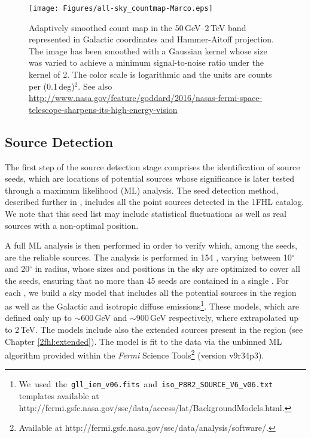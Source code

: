 \begin{figure}[!ht]
    \begin{centering} 
        \texttt{[image: Figures/all-sky\_countmap-Marco.eps]}
        \caption[Adaptively smoothed count map in the 50\,GeV--2\,TeV band]{Adaptively smoothed count map in the 50\,GeV--2\,TeV band represented in Galactic coordinates and Hammer-Aitoff projection. The image has been smoothed with a Gaussian kernel whose size was varied to achieve a minimum signal-to-noise ratio under the kernel of 2. The color scale is logarithmic and the units are counts per (0.1\,deg)$^2$. See also \url{http://www.nasa.gov/feature/goddard/2016/nasas-fermi-space-telescope-sharpens-its-high-energy-vision} 
            \label{fig:skymap}}
    \end{centering}
\end{figure}


\subsection{\label{2fhl:sourceDetect}Source Detection}


The first step of the source detection stage comprises the identification of source seeds, which are locations of potential sources whose significance is later tested through a maximum likelihood (ML) analysis. The seed detection method, described further in \cite{2FHL}, includes all the point sources detected in the 1FHL catalog. We note that  this seed list may include statistical fluctuations as well as real sources with a non-optimal position.

A full ML analysis is then performed in order to verify which,
among the seeds, are the reliable sources. 
The analysis is performed in 154 \rois{}, varying between 10$^{\circ}$ and 20$^{\circ}$ in radius, whose sizes and positions in the sky are optimized to cover all the seeds, ensuring that no more than 45 seeds are contained in a single \roi{}.
For each \roi{}, we build
a sky model that includes all the potential sources in the region
as well as the  Galactic and isotropic diffuse emissions\footnote{We~used~the~{\tt gll\_iem\_v06.fits}~and~{\tt iso\_P8R2\_SOURCE\_V6\_v06.txt}
    templates available at \\
    http://fermi.gsfc.nasa.gov/ssc/data/access/lat/BackgroundModels.html.}.
These models, which are defined only up to $\sim$600\,GeV and  $\sim$900\,GeV respectively, where extrapolated up to 2\,TeV.
The \roi{} models include also the extended sources present in the region (see Chapter \ref{2fhl:extended}).
The model is fit to the data via the unbinned ML algorithm provided
within the {\it Fermi} Science Tools\footnote{Available at 
    http://fermi.gsfc.nasa.gov/ssc/data/analysis/software/.} (version v9r34p3).

